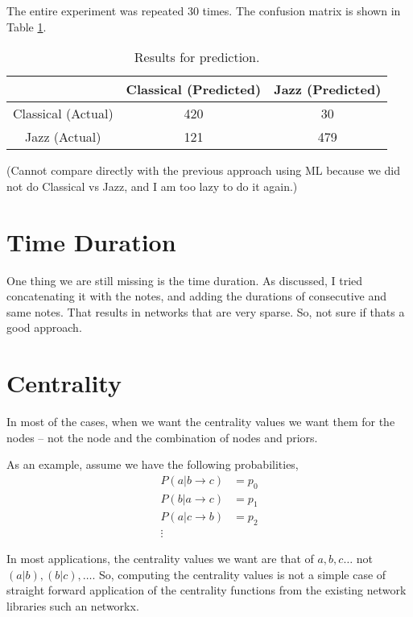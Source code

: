 \documentclass[]{article}
\begin{document}
The entire experiment was repeated $30$ times. The confusion matrix is shown in Table \ref{tab:prediction}.

\begin{table}
	\centering
	\begin{tabular}{c|c|c|}
		& Classical (Predicted) & Jazz (Predicted)  \\ 
		\hline 
		Classical (Actual)& 420  & 30  \\ 
		\hline 
		Jazz (Actual)& 121  & 479  \\ 
		\hline 
	\end{tabular} 
	\caption{Results for prediction.} \label{tab:prediction}
\end{table}

(Cannot compare directly with the previous approach using ML because we did not do Classical vs Jazz, and I am too lazy to do it again.)

\section{Time Duration}
One thing we are still missing is the time duration. As discussed, I tried concatenating it with the notes, and adding the durations of consecutive and same notes. That results in networks that are very sparse. So, not sure if thats a good approach.

\section{Centrality}

In most of the cases, when we want the centrality values we want them for the nodes -- not the node and the combination of nodes and priors.

As an example, assume we have the following probabilities,
\begin{align*}
	P \left(a \vert b \rightarrow c\right) &= p_0\\
	P \left(b \vert a \rightarrow c\right) &= p_1\\
	P \left(a \vert c \rightarrow b\right) &= p_2\\
	\vdots
\end{align*}

In most applications, the centrality values we want are that of $a,b,c \ldots$ not $(a\vert b), (b \vert c), \ldots$. So, computing the centrality values is not a simple case of straight forward application of the centrality functions from the existing network libraries such an networkx.
\end{document}
